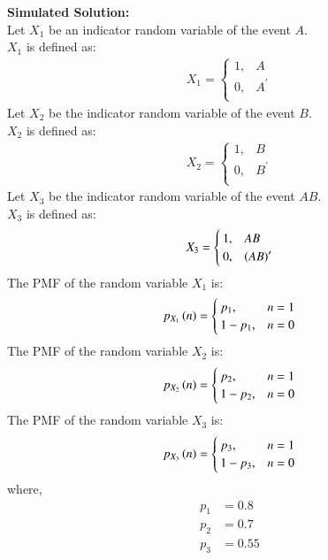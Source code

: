 \documentclass[journal]{IEEEtran}
\begin{document}
\textbf{Simulated Solution:\\}
Let \(X_1\) be an indicator random variable of the event \(A\).\\
\(X_1\) is defined as:
\begin{align}
	X_1 =
	\begin{cases}
		1 ,& A\\
		0 ,& A^\prime\\
	\end{cases}
\end{align}
Let \(X_2\) be the indicator random variable of the event \(B\).\\
\(X_2\) is defined as:
\begin{align}
	X_2 =
	\begin{cases}
		1 ,& B\\
		0 ,& B^\prime\\
	\end{cases}
\end{align}
Let \(X_3\) be the indicator random variable of the event \(AB\).\\
\(X_3\) is defined as:
\begin{align}
	X_3 =
	\begin{cases}
		1 ,& AB\\
		0 ,& \left(AB\right)^\prime\\
	\end{cases}
\end{align}
The PMF of the random variable \(X_1\) is:
\begin{align}
	p_{X_1}\left(n\right) =
	\begin{cases}
		p_1 ,& n = 1\\
		1 - p_1 ,& n = 0
	\end{cases}
\end{align}
The PMF of the random variable \(X_2\) is:
\begin{align}
	p_{X_2}\left(n\right) =
	\begin{cases}
		p_2 ,& n = 1\\
		1 - p_2 ,& n = 0
	\end{cases}
\end{align}
The PMF of the random variable \(X_3\) is:
\begin{align}
	p_{X_3}\left(n\right) =
	\begin{cases}
		p_3 ,& n = 1\\
		1 - p_3 ,& n = 0
	\end{cases}
\end{align}
where,
\begin{align}
	p_1 &= 0.8\\
	p_2 &= 0.7\\
	p_3 &= 0.55\\
\end{align}
\end{document}
